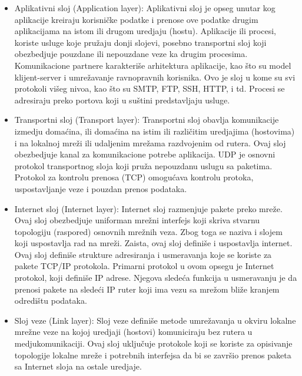\documentclass[a4paper,12pt, master]{etf}
\begin{document}
	\begin{itemize}
		\item Aplikativni sloj (Application layer):
		Aplikativni sloj je opseg unutar kog aplikacije kreiraju korisni\v{c}ke 
		podatke i prenose ove podatke drugim aplikacijama na istom ili drugom 
		uredjaju (hostu). Aplikacije ili procesi, koriste usluge koje 
		pru\v{z}aju donji slojevi, posebno transportni sloj koji 		
		obezbedjuje pouzdane ili nepouzdane veze ka drugim procesima. 
		Komunikacione partnere karakteri\v{s}e arhitektura aplikacije, kao 
		\v{s}to su model klijent-server i umre\v{z}avanje ravnopravnih 
		korisnika. Ovo je sloj u kome su svi protokoli vi\v{s}eg nivoa, kao 
		\v{s}to su SMTP, FTP, SSH, HTTP, i td. Procesi se adresiraju preko 
		portova koji u su\v{s}tini predstavljaju usluge.
		\item Transportni sloj (Transport layer):
		Transportni sloj obavlja komunikacije izmedju doma\'{c}ina, ili 
		doma\'{c}ina na istim ili razli\v{c}itim uredjajima (hostovima) i na 
		lokalnoj mre\v{z}i ili udaljenim mre\v{z}ama razdvojenim od rutera. 
		Ovaj sloj obezbedjuje kanal za komunikacione potrebe aplikacija. UDP je
		osnovni protokol transportnog sloja koji pru\v{z}a nepouzdanu uslugu sa 
		paketima. Protokol za kontrolu prenosa (TCP) omogu\'{c}ava kontrolu 
		protoka, uspostavljanje veze i pouzdan prenos podataka.
		\item Internet sloj (Internet layer):
		Internet sloj razmenjuje pakete preko mre\v{z}e. Ovaj sloj obezbedjuje 
		uniforman mre\v{z}ni interfejs koji skriva stvarnu topologiju (raspored)
		 osnovnih mre\v{z}nih veza. Zbog toga se naziva i slojem koji 
		uspostavlja rad na mre\v{z}i. Zaista, ovaj sloj defini\v{s}e i 
		uspostavlja	internet. Ovaj sloj defini\v{s}e strukture adresiranja i 
		usmeravanja koje se koriste za pakete TCP/IP protokola. Primarni 
		protokol u ovom opsegu je Internet protokol, koji defini\v{s}e IP 
		adrese. Njegova slede\'{c}a funkcija u usmeravanju je da prenosi pakete
		na slede\'{c}i IP ruter koji ima vezu sa mre\v{z}om bli\v{z}e kranjem 
		odredi\v{s}tu podataka.
		\item Sloj veze (Link layer):
		Sloj veze defini\v{s}e metode umre\v{z}avanja u okviru lokalne 
		mre\v{z}ne veze na kojoj uredjaji (hostovi) komuniciraju bez rutera u 
		medjukomunikaciji. Ovaj sloj uklju\v{c}uje protokole koji se koriste za 
		opisivanje topologije lokalne mre\v{z}e i potrebnih interfejsa da bi se
		zavr\v{s}io prenos paketa sa Internet sloja na ostale uredjaje.
	\end{itemize}
\end{document}

